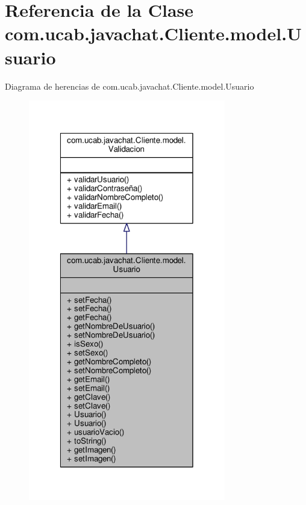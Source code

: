 \hypertarget{classcom_1_1ucab_1_1javachat_1_1_cliente_1_1model_1_1_usuario}{\section{Referencia de la Clase com.\-ucab.\-javachat.\-Cliente.\-model.\-Usuario}
\label{classcom_1_1ucab_1_1javachat_1_1_cliente_1_1model_1_1_usuario}
}


Diagrama de herencias de com.\-ucab.\-javachat.\-Cliente.\-model.\-Usuario\nopagebreak
\begin{figure}[H]
\begin{center}
\leavevmode
\includegraphics[width=244pt]{classcom_1_1ucab_1_1javachat_1_1_cliente_1_1model_1_1_usuario__inherit__graph}
\end{center}
\end{figure}


